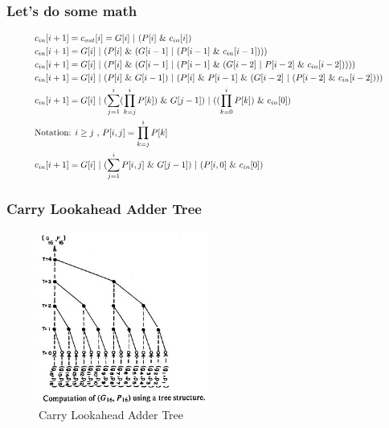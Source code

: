\begin{frame}
    \frametitle{Let's do some math}
    \begin{equation}
        \resizebox{0.9\textwidth}{!}{%
            $
            \begin{aligned}
                &c_{in}[i+1]=c_{out}[i]=G[i] \ | \  (P[i] \ \& \ c_{in}[i])\\
                &c_{in}[i+1]=G[i] \ | \  (P[i] \ \& \ (G[i-1]  \ | \  (P[i-1] \ \& \ c_{in}[i-1])))\\
                &c_{in}[i+1]=G[i] \ | \  (P[i] \ \& \ (G[i-1]  \ | \  (P[i-1] \ \& \ (G[i-2]  \ | \  P[i-2] \ \& \ c_{in}[i-2]))))\\
                &c_{in}[i+1]=G[i] \ | \  (P[i] \ \& \ G[i-1])  \ | \  (P[i] \ \& \ P[i-1] \ \& \ (G[i-2]  \ | \  (P[i-2] \ \& \ c_{in}[i-2])))\\
                &c_{in}[i+1]=G[i] \ | \  (\sum_{j=1}^{i} (\prod_{k=j}^{i} P[k]) \  \& \ G[j-1]) \ | \  ((\prod_{k=0}^{i} P[k]) \ \& \ c_{in}[0])\\
                &\text{Notation: } i \geq j \text{ , } P[i, j] = \prod_{k=j}^{i} P[k] \\
                &c_{in}[i+1]=G[i] \ | \  (\sum_{j=1}^{i} P[i, j] \  \& \ G[j-1]) \ | \  (P[i, 0] \ \& \ c_{in}[0])\\
            \end{aligned}$%
        }
    \end{equation}
\end{frame}

\begin{frame}
    \frametitle{Carry Lookahead Adder Tree}
    \begin{figure}
        \centering
        \includegraphics[width=0.5\textwidth]{media/cla_tree.jpg}
        \caption{Carry Lookahead Adder Tree}
    \end{figure}
\end{frame}


